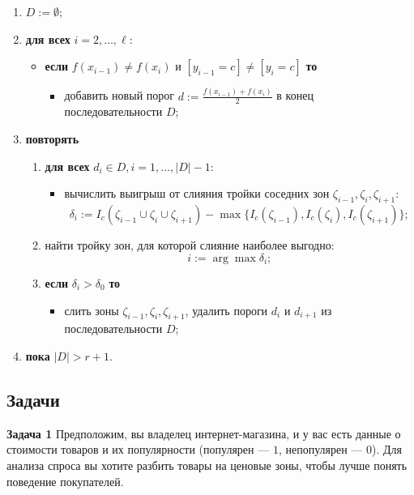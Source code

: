 \begin{enumerate}
    \item $D := \emptyset;$
    \item \textbf{для всех} $i = 2, \dots, \ell$:
    \begin{itemize}
        \item \textbf{если} $f(x_{i-1}) \neq f(x_i)$ и $[y_{i-1} = c] \neq [y_i = c]$ \textbf{то}
        \begin{itemize}
            \item добавить новый порог $d := \frac{f(x_{i-1}) + f(x_i)}{2}$ в конец последовательности $D$;
        \end{itemize}
    \end{itemize}
    \item \textbf{повторять}
    \begin{enumerate}
        \item \textbf{для всех} $d_i \in D, i = 1, \dots, |D| - 1$:
        \begin{itemize}
            \item вычислить выигрыш от слияния тройки соседних зон $\zeta_{i-1}, \zeta_i, \zeta_{i+1}$:
            \[
            \delta_i := I_c(\zeta_{i-1} \cup \zeta_i \cup \zeta_{i+1}) - \max\{I_c(\zeta_{i-1}), I_c(\zeta_i), I_c(\zeta_{i+1})\};
            \]
        \end{itemize}
        \item найти тройку зон, для которой слияние наиболее выгодно:
        \[
        i := \arg \max \delta_i;
        \]
        \item \textbf{если} $\delta_i > \delta_0$ \textbf{то}
        \begin{itemize}
            \item слить зоны $\zeta_{i-1}, \zeta_i, \zeta_{i+1}$, удалить пороги $d_i$ и $d_{i+1}$ из последовательности $D$;
        \end{itemize}
    \end{enumerate}
    \item \textbf{пока} $|D| > r + 1$.
\end{enumerate}

\subsection{Задачи}

\textbf{Задача 1}
Предположим, вы владелец интернет-магазина, и у вас есть данные о стоимости товаров и их популярности (популярен — \( 1 \), непопулярен — \( 0 \)). 
Для анализа спроса вы хотите разбить товары на ценовые зоны, чтобы лучше понять поведение покупателей.


